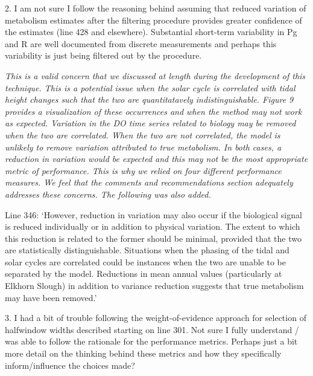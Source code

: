 \documentclass[letterpaper,12pt]{article}\usepackage[]{graphicx}\usepackage[]{color}
\begin{document}
2. I am not sure I follow the reasoning behind assuming that reduced variation of metabolism estimates after the filtering procedure provides greater confidence of the estimates (line 428 and elsewhere). Substantial short-term variability in Pg and R are well documented from discrete measurements and perhaps this variability is just being filtered out by the procedure.

{\it This is a valid concern that we discussed at length during the development of this technique.  This is a potential issue when the solar cycle is correlated with tidal height changes such that the two are quantitatavely indistinguishable.  Figure 9 provides a visualization of these occurrences and when the method may not work as expected. Variation in the DO time series related to biology may be removed when the two are correlated.  When the two are not correlated, the model is unlikely to remove variation attributed to true metabolism.  In both cases, a reduction in variation would be expected and this may not be the most appropriate metric of performance. This is why we relied on four different performance measures. We feel that the comments and recommendations section adequately addresses these concerns.  The following was also added.

Line 346: `However, reduction in variation may also occur if the biological signal is reduced individually or in addition to physical variation.  The extent to which this reduction is related to the former should be minimal, provided that the two are statistically distinguishable.  Situations when the phasing of the tidal and solar cycles are correlated could be instances when the two are unable to be separated by the model.  Reductions in mean annual values (particularly at Elkhorn Slough) in addition to variance reduction suggests that true metabolism may have been removed.'
}

3. I had a bit of trouble following the weight-of-evidence approach for selection of halfwindow widths described starting on line 301. Not sure I fully understand / was able to follow the rationale for the performance metrics. Perhaps just a bit more detail on the thinking behind these metrics and how they specifically inform/influence the choices made?
\end{document}
